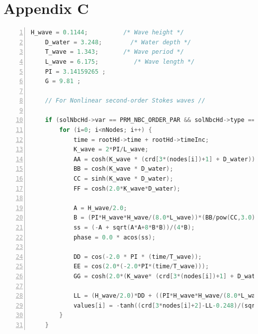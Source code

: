 \documentclass[12pt]{article} %
\begin{document}
\section*{Appendix C}
\begin{lstlisting}[language=C, caption={Hard code for inlet wave run-up}, label={lst:wave_runup}, basicstyle=\ttfamily\footnotesize, keywordstyle=\color{blue}, commentstyle=\color{green}, numbers=left, numberstyle=\tiny\color{gray}, breaklines=true]
    H_wave = 0.1144;          /* Wave height */
    D_water = 3.248;        /* Water depth */
    T_wave = 1.343;       /* Wave period */
    L_wave = 6.175;          /* Wave length */
    PI = 3.14159265 ;
    G = 9.81 ;
    
    // For Nonlinear second-order Stokes waves //
    
    if (solNbcHd->var == PRM_NBC_ORDER_PAR && solNbcHd->type == PRM_NBC_USR_DEF) {
        for (i=0; i<nNodes; i++) {
            time = rootHd->time + rootHd->timeInc;
            K_wave = 2*PI/L_wave;
            AA = cosh(K_wave * (crd[3*(nodes[i])+1] + D_water));
            BB = cosh(K_wave * D_water);
            CC = sinh(K_wave * D_water);
            FF = cosh(2.0*K_wave*D_water);
    
            A = H_wave/2.0;
            B = (PI*H_wave*H_wave/(8.0*L_wave))*(BB/pow(CC,3.0))*(2.0+FF);
            ss = (-A + sqrt(A*A+8*B*B))/(4*B);
            phase = 0.0 * acos(ss);
    
            DD = cos(-2.0 * PI * (time/T_wave));
            EE = cos(2.0*(-2.0*PI*(time/T_wave)));
            GG = cosh(2.0*(K_wave* (crd[3*(nodes[i])+1] + D_water)));
    
            LL = (H_wave/2.0)*DD + ((PI*H_wave*H_wave/(8.0*L_wave))*(BB/pow(CC,3.0))*(2.0+FF)*EE);
            values[i] = -tanh((crd[3*nodes[i]+2]-LL-0.248)/(sqrt(2) * rootHd->epsilon));
        }
    }
    \end{lstlisting}
\end{document}
